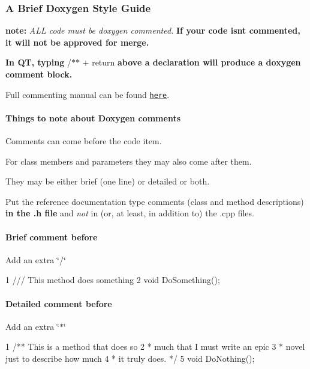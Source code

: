 \subsubsection*{A Brief Doxygen Style Guide}

{\bfseries note\+:} {\itshape A\+LL code must be doxygen commented.} {\bfseries If your code isn\textquotesingle{}t commented, it will not be approved for merge.}

{\bfseries In QT, typing} {\ttfamily /$\ast$$\ast$ + return} {\bfseries above a declaration will produce a doxygen comment block.}

Full commenting manual can be found \href{http://www.stack.nl/~dimitri/doxygen/manual/docblocks.html}{\tt here}.

\paragraph*{Things to note about Doxygen comments}


\begin{DoxyItemize}
\item Comments can come before the code item.
\item For class members and parameters they may also come after them.
\item They may be either brief (one line) or detailed or both.
\item Put the reference documentation type comments (class and method descriptions) {\bfseries in the .h file} and {\itshape not} in (or, at least, in addition to) the .cpp files.
\end{DoxyItemize}

\paragraph*{Brief comment before}

Add an extra \char`\"{}/\char`\"{}


\begin{DoxyCode}
1 /// This method does something
2 void DoSomething();
\end{DoxyCode}


\paragraph*{Detailed comment before}

Add an extra \char`\"{}$\ast$\char`\"{}


\begin{DoxyCode}
1 /** This is a method that does so
2   * much that I must write an epic 
3   * novel just to describe how much
4   * it truly does. */
5 void DoNothing();
\end{DoxyCode}



